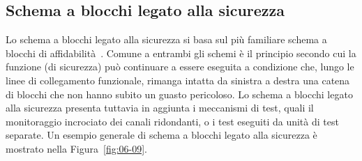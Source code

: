 \subsection{Schema a blocchi legato alla sicurezza}
\label{subsec:06-2-9}
Lo schema a blocchi legato alla sicurezza si basa sul più familiare schema a blocchi di affidabilità~\cite{birolini2010}. Comune a entrambi gli schemi è il principio secondo cui la funzione (di sicurezza) può continuare a essere eseguita a condizione che, lungo le linee di collegamento funzionale, rimanga intatta da sinistra a destra una catena di blocchi che non hanno subito un guasto pericoloso. Lo schema a blocchi legato alla sicurezza presenta tuttavia in aggiunta i meccanismi di test, quali il monitoraggio incrociato dei canali ridondanti, o i test eseguiti da unità di test separate. Un esempio generale di schema a blocchi legato alla sicurezza è mostrato nella Figura~\ref{fig:06-09}.

